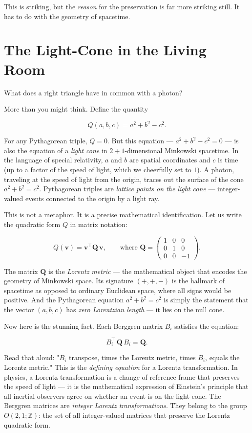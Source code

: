 This is striking, but the \textit{reason} for the preservation is far more striking still. It has to do with the geometry of spacetime.

\bigskip

\section*{The Light-Cone in the Living Room}

What does a right triangle have in common with a photon?

More than you might think. Define the quantity

\[
Q(a, b, c) = a^2 + b^2 - c^2.
\]

For any Pythagorean triple, $Q = 0$. But this equation --- $a^2 + b^2 - c^2 = 0$ --- is also the equation of a \textit{light cone} in $2 + 1$-dimensional Minkowski spacetime. In the language of special relativity, $a$ and $b$ are spatial coordinates and $c$ is time (up to a factor of the speed of light, which we cheerfully set to $1$). A photon, traveling at the speed of light from the origin, traces out the surface of the cone $a^2 + b^2 = c^2$. Pythagorean triples are \textit{lattice points on the light cone} --- integer-valued events connected to the origin by a light ray.

This is not a metaphor. It is a precise mathematical identification. Let us write the quadratic form $Q$ in matrix notation:

\[
Q(\mathbf{v}) = \mathbf{v}^\top \mathbf{Q} \, \mathbf{v}, \qquad \text{where } \mathbf{Q} = \begin{pmatrix} 1 & 0 & 0 \\ 0 & 1 & 0 \\ 0 & 0 & -1 \end{pmatrix}.
\]

The matrix $\mathbf{Q}$ is the \textit{Lorentz metric} --- the mathematical object that encodes the geometry of Minkowski space. Its signature $(+, +, -)$ is the hallmark of spacetime as opposed to ordinary Euclidean space, where all signs would be positive. And the Pythagorean equation $a^2 + b^2 = c^2$ is simply the statement that the vector $(a, b, c)$ has \textit{zero Lorentzian length} --- it lies on the null cone.

Now here is the stunning fact. Each Berggren matrix $B_i$ satisfies the equation:

\[
B_i^\top \, \mathbf{Q} \, B_i = \mathbf{Q}.
\]

Read that aloud: "$B_i$ transpose, times the Lorentz metric, times $B_i$, equals the Lorentz metric." This is the \textit{defining equation} for a Lorentz transformation. In physics, a Lorentz transformation is a change of reference frame that preserves the speed of light --- it is the mathematical expression of Einstein's principle that all inertial observers agree on whether an event is on the light cone. The Berggren matrices are \textit{integer Lorentz transformations}. They belong to the group $O(2, 1; \mathbb{Z})$: the set of all integer-valued matrices that preserve the Lorentz quadratic form.

